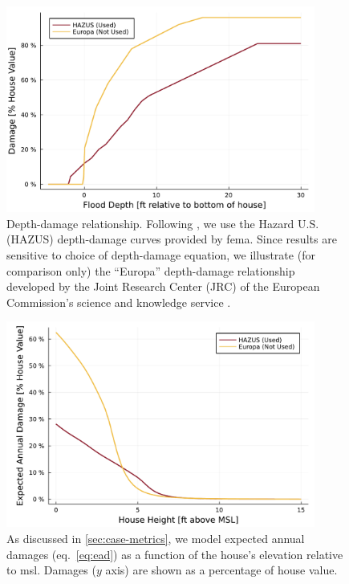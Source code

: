 \documentclass[11pt]{article}
\begin{document}
\begin{figure}
    \centering
    \includegraphics[width=4in]{cost-depth-damage}
    \caption{
        Depth-damage relationship.
        Following \citet{zarekarizi_suboptimal:2020}, we use the Hazard U.S. (HAZUS) depth-damage curves provided by \gls{fema}.
        Since results are sensitive to choice of depth-damage equation, we illustrate (for comparison only) the ``Europa'' depth-damage relationship developed by the Joint Research Center (JRC) of the European Commission's science and knowledge service \citep{huizinga_depthdamage:2016}.
    }\label{fig:cost-depth-damage}
\end{figure}

\begin{figure}
    \centering
    \includegraphics[width=4in]{cost-expected-damage-emulator}
    \caption{
        As discussed in \cref{sec:case-metrics}, we model expected annual damages (eq.~\ref{eq:ead}) as a function of the house's elevation relative to \gls{msl}.
        Damages ($y$ axis) are shown as a percentage of house value.
    }\label{fig:cost-expected-damage-emulator}
\end{figure}
\end{document}
